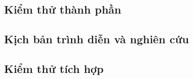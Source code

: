 \par{}
\subsection{Kiểm thử thành phần}\label{subsection:implementation-8}

\par{}
\subsection{Kịch bản trình diễn và nghiên cứu}\label{subsection:implementation-9}

\par{}
\subsection{Kiểm thử tích hợp}\label{subsection:implementation-10}

